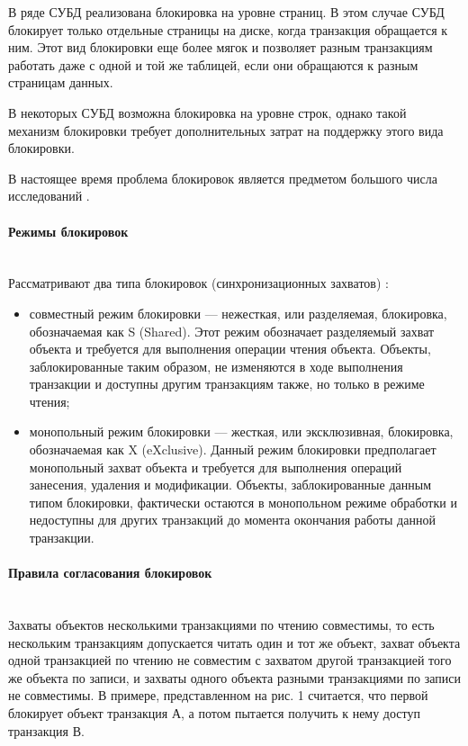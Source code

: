 В ряде СУБД реализована блокировка на уровне страниц. В этом случае СУБД блокирует только отдельные страницы на диске, когда транзакция обращается к ним. Этот вид блокировки еще более мягок и позволяет разным транзакциям работать даже с одной и той же таблицей, если они обращаются к разным страницам данных.

В некоторых СУБД возможна блокировка на уровне строк, однако такой механизм блокировки требует дополнительных затрат на поддержку этого вида блокировки.

В настоящее время проблема блокировок является предметом большого числа исследований \autocite{Intuit}.

\paragraph{Режимы блокировок} ~\\

Рассматривают два типа блокировок (синхронизационных захватов) \autocite{Intuit}:
\begin{itemize}
\item совместный режим блокировки — нежесткая, или разделяемая, блокировка, обозначаемая как S (Shared). Этот режим обозначает разделяемый захват объекта и требуется для выполнения операции чтения объекта. Объекты, заблокированные таким образом, не изменяются в ходе выполнения транзакции и доступны другим транзакциям также, но только в режиме чтения;
\item монопольный режим блокировки — жесткая, или эксклюзивная, блокировка, обозначаемая как X (eXclusive). Данный режим блокировки предполагает монопольный захват объекта и требуется для выполнения операций занесения, удаления и модификации. Объекты, заблокированные данным типом блокировки, фактически остаются в монопольном режиме обработки и недоступны для других транзакций до момента окончания работы данной транзакции.
\end{itemize}
\paragraph{Правила согласования блокировок}~\\

Захваты объектов несколькими транзакциями по чтению совместимы, то есть нескольким транзакциям допускается читать один и тот же объект, захват объекта одной транзакцией по чтению не совместим с захватом другой транзакцией того же объекта по записи, и захваты одного объекта разными транзакциями по записи не совместимы. В примере, представленном на рис. 1 считается, что первой блокирует объект транзакция А, а потом пытается получить к нему доступ транзакция В.

